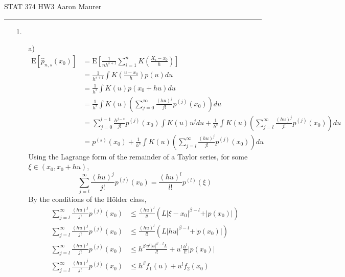 \documentclass[11pt]{article}
\newcommand{\E}{\mathrm{E}}
\theoremstyle{definition}
\begin{document}
STAT 374 HW3 \hfill Aaron Maurer
\vspace{2mm}
\hrule
\vspace{2mm}
\begin{itemize}
    \item[1.]
        \begin{itemize}
            \item[a)]
                \begin{align*}
                    \E[\hat p_{n,s}(x_0)] &= \E\left[\frac{1}{nh^{s+1}}\sum_{i=1}^n K\left(\frac{X_i-x_0}{h}\right)\right] \\
                                        &= \frac{1}{h^{s+1}}\int K\left(\frac{u-x_0}{h}\right)p(u) du\\
                                        &= \frac{1}{h^{s}}\int K\left(u\right)p(x_0+hu) du\\
                                        &= \frac{1}{h^{s}}\int K(u)\left(\sum_{j=0}^\infty \frac{(hu)^j}{j!}p^{(j)}(x_0)\right) du\\
                                        &= \sum_{j=0}^{l-1}\frac{h^{j-s}}{j!}p^{(j)}(x_0)\int K(u)u^j du + \frac{1}{h^{s}}\int K(u)\left(\sum_{j=l}^\infty \frac{(hu)^j}{j!}p^{(j)}(x_0)\right) du\\
                                        &= p^{(s)}(x_0)+ \frac{1}{h^{s}}\int K(u)\left(\sum_{j=l}^\infty \frac{(hu)^j}{j!}p^{(j)}(x_0)\right) du
                \end{align*}
                Using the Lagrange form of the remainder of a Taylor series, for some $\xi\in(x_0,x_0+hu)$,
                \[\sum_{j=l}^\infty \frac{(hu)^j}{j!}p^{(j)}(x_0) = \frac{(hu)^l}{l!}p^{(l)}(\xi)\]
                By the conditions of the H{\"o}lder class,
                \begin{align*}
                    \sum_{j=l}^\infty \frac{(hu)^j}{j!}p^{(j)}(x_0) &\leq \frac{(hu)^l}{l!}(L\vert \xi - x_0\vert^{\beta-l} + \vert p(x_0)\vert) \\
                    \sum_{j=l}^\infty \frac{(hu)^j}{j!}p^{(j)}(x_0) &\leq \frac{(hu)^l}{l!}(L\vert hu\vert^{\beta-l}  + \vert p(x_0)\vert) \\
                    \sum_{j=l}^\infty \frac{(hu)^j}{j!}p^{(j)}(x_0) &\leq h^\beta\frac{u^l\vert u \vert^{\beta-l}L}{l!}+ u^l\frac{h^l}{l!}\vert p(x_0)\vert \\
                    \sum_{j=l}^\infty \frac{(hu)^j}{j!}p^{(j)}(x_0) &\leq h^\beta f_1(u)+ u^lf_2(x_0) \\

\end{align*}
\end{itemize}
\end{itemize}
\end{document}
